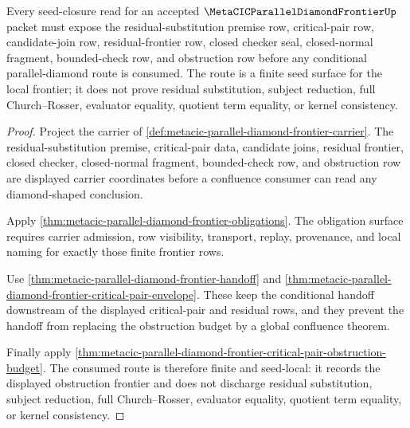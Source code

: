 \begin{theorem}
\label{thm:metacic-parallel-diamond-frontier-closure-seed-route}
Every seed-closure read for an accepted $\MetaCICParallelDiamondFrontierUp$ packet must expose the residual-substitution premise row, critical-pair row, candidate-join row, residual-frontier row, closed checker seal, closed-normal fragment, bounded-check row, and obstruction row before any conditional parallel-diamond route is consumed. The route is a finite seed surface for the local frontier; it does not prove residual substitution, subject reduction, full Church--Rosser, evaluator equality, quotient term equality, or kernel consistency.
\end{theorem}
\begin{proof}
Project the carrier of \autoref{def:metacic-parallel-diamond-frontier-carrier}. The residual-substitution premise, critical-pair data, candidate joins, residual frontier, closed checker, closed-normal fragment, bounded-check row, and obstruction row are displayed carrier coordinates before a confluence consumer can read any diamond-shaped conclusion.

Apply \autoref{thm:metacic-parallel-diamond-frontier-obligations}. The obligation surface requires carrier admission, row visibility, transport, replay, provenance, and local naming for exactly those finite frontier rows.

Use \autoref{thm:metacic-parallel-diamond-frontier-handoff} and \autoref{thm:metacic-parallel-diamond-frontier-critical-pair-envelope}. These keep the conditional handoff downstream of the displayed critical-pair and residual rows, and they prevent the handoff from replacing the obstruction budget by a global confluence theorem.

Finally apply \autoref{thm:metacic-parallel-diamond-frontier-critical-pair-obstruction-budget}. The consumed route is therefore finite and seed-local: it records the displayed obstruction frontier and does not discharge residual substitution, subject reduction, full Church--Rosser, evaluator equality, quotient term equality, or kernel consistency.
\end{proof}
